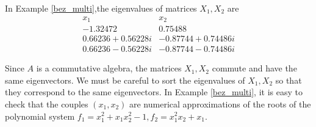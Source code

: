 \documentclass{standalone}
\begin{document}
In Example \ref{bez_multi},the eigenvalues of matrices $X_1, X_2$ are
$$
\begin{array}{c|c}
	x_1 & x_2 \\
	\hline
	-1.32472  & 0.75488 \\
	0.66236 + 0.56228i & -0.87744 + 0.74486i \\
	0.66236 - 0.56228i & -0.87744 - 0.74486i
\end{array}
$$

Since $A$ is a commutative algebra, the matrices $X_1, X_2$ commute and have the same eigenvectors. We must be careful to sort the eigenvalues of $X_1, X_2$ so that they correspond to the same eigenvectors. In Example \ref{bez_multi}, it is easy to check that the couples $(x_1, x_2)$ are numerical approximations of the roots of the polynomial system $f_1 = x_1^2 + x_1x_2^2 - 1, f_2 = x_1^2x_2 + x_1$.
\end{document}
